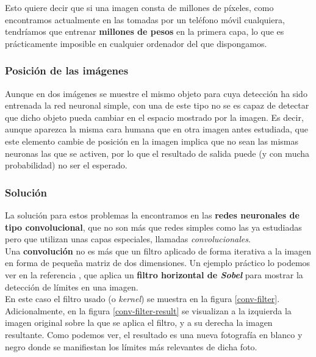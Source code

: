 \documentclass[]{article}
\begin{document}
			Esto quiere decir que si una imagen consta de millones de píxeles, como encontramos actualmente en las tomadas por un teléfono móvil cualquiera, tendríamos que entrenar \textbf{millones de pesos} en la primera capa, lo que es prácticamente imposible en cualquier ordenador del que dispongamos.
			 
		\subsubsection*{Posición de las imágenes}
		
			Aunque en dos imágenes se muestre el mismo objeto para cuya detección ha sido entrenada la red neuronal simple, con una de este tipo no se es capaz de detectar que dicho objeto pueda cambiar en el espacio mostrado por la imagen. Es decir, aunque aparezca la misma cara humana que en otra imagen antes estudiada, que este elemento cambie de posición en la imagen implica que no sean las mismas neuronas las que se activen, por lo que el resultado de salida puede (y con mucha probabilidad) no ser el esperado.
			
		\subsubsection*{Solución}
		
			La solución para estos problemas la encontramos en las \textbf{redes neuronales de tipo convolucional}, que no son más que redes simples como las ya estudiadas pero que utilizan unas capas especiales, llamadas \textit{convolucionales}.\\
			
			Una \textbf{convolución} no es más que un filtro aplicado de forma iterativa a la imagen en forma de pequeña matriz de dos dimensiones. Un ejemplo práctico lo podemos ver en la referencia \cite{intro-convolutional-nn}, que aplica un \textbf{filtro horizontal de \textit{Sobel}} para mostrar la detección de límites en una imagen.\\
			
			En este caso el filtro usado (o \textit{kernel}) se muestra en la figura \ref{conv-filter}. Adicionalmente, en la figura \ref{conv-filter-result} se visualizan a la izquierda la imagen original sobre la que se aplica el filtro, y a su derecha la imagen resultante. Como podemos ver, el resultado es una nueva fotografía en blanco y negro donde se manifiestan los límites más relevantes de dicha foto.\\
			
\end{document}

